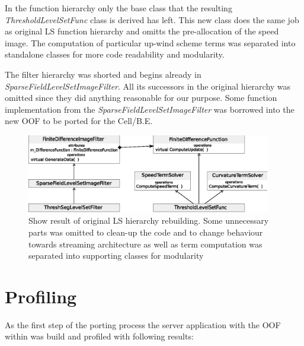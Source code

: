 \par
In the function hierarchy only the base class that the resulting \mbox{\emph{ThresholdLevelSetFunc}} class is derived has left.
This new class does the same job as original LS function hierarchy and omitts the pre-allocation of the speed image.
The computation of particular up-wind scheme terms was separated into standalone classes for more code readability and modularity.
\par
The filter hierarchy was shorted and begins already in \mbox{\emph{SparseFieldLevelSetImageFilter}}.
All its successors in the original hierarchy was omitted since they did anything reasonable for our purpose.
Some function implementation from the \mbox{\emph{SparseFieldLevelSetImageFilter}} was borrowed into the new OOF to be ported for the \mbox{Cell/B.E.}

\begin{figure}
    \centering
    \includegraphics[width=0.95\textwidth]{data/resultingFilter}
    \caption[Resulting level set filter ready to be ported to \mbox{Cell/B.E.}]
    {
Show result of original LS hierarchy rebuilding.
Some unnecessary parts was omitted to clean-up the code and to change behaviour towards streaming architecture as well as term computation was separated into supporting classes for modularity
    }
    \label{fg:resultingFilter}
\end{figure}

\section{Profiling}

As the first step of the porting process the server application with the OOF within was build and profiled with following results:

